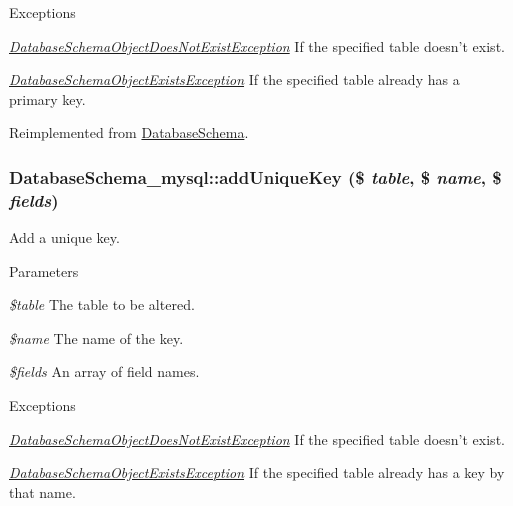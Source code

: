 \begin{DoxyExceptions}{Exceptions}
\item[{\em \hyperlink{classDatabaseSchemaObjectDoesNotExistException}{DatabaseSchemaObjectDoesNotExistException}}]If the specified table doesn't exist. \item[{\em \hyperlink{classDatabaseSchemaObjectExistsException}{DatabaseSchemaObjectExistsException}}]If the specified table already has a primary key. \end{DoxyExceptions}


Reimplemented from \hyperlink{classDatabaseSchema_abe9490392e8408eb3847256aeb15bba0}{DatabaseSchema}.\hypertarget{classDatabaseSchema__mysql_a5e5e984d6f48b61962290a4715e3c143}{
\subsubsection[{addUniqueKey}]{\setlength{\rightskip}{0pt plus 5cm}DatabaseSchema\_\-mysql::addUniqueKey (\$ {\em table}, \/  \$ {\em name}, \/  \$ {\em fields})}}
\label{classDatabaseSchema__mysql_a5e5e984d6f48b61962290a4715e3c143}
Add a unique key.


\begin{DoxyParams}{Parameters}
\item[{\em \$table}]The table to be altered. \item[{\em \$name}]The name of the key. \item[{\em \$fields}]An array of field names.\end{DoxyParams}

\begin{DoxyExceptions}{Exceptions}
\item[{\em \hyperlink{classDatabaseSchemaObjectDoesNotExistException}{DatabaseSchemaObjectDoesNotExistException}}]If the specified table doesn't exist. \item[{\em \hyperlink{classDatabaseSchemaObjectExistsException}{DatabaseSchemaObjectExistsException}}]If the specified table already has a key by that name. \end{DoxyExceptions}


